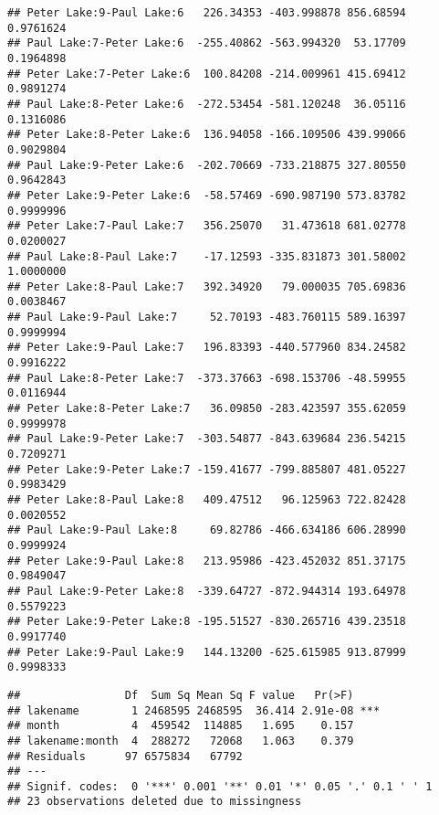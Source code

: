 \documentclass[]{article}
\newenvironment{Shaded}{\begin{snugshade}}{\end{snugshade}}
\newcommand{\CommentTok}[1]{\textcolor[rgb]{0.56,0.35,0.01}{\textit{#1}}}
\newcommand{\DataTypeTok}[1]{\textcolor[rgb]{0.13,0.29,0.53}{#1}}
\newcommand{\FloatTok}[1]{\textcolor[rgb]{0.00,0.00,0.81}{#1}}
\newcommand{\KeywordTok}[1]{\textcolor[rgb]{0.13,0.29,0.53}{\textbf{#1}}}
\newcommand{\NormalTok}[1]{#1}
\newcommand{\OperatorTok}[1]{\textcolor[rgb]{0.81,0.36,0.00}{\textbf{#1}}}
\newcommand{\StringTok}[1]{\textcolor[rgb]{0.31,0.60,0.02}{#1}}
\begin{document}
\begin{verbatim}
## Peter Lake:9-Paul Lake:6   226.34353 -403.998878 856.68594 0.9761624
## Paul Lake:7-Peter Lake:6  -255.40862 -563.994320  53.17709 0.1964898
## Peter Lake:7-Peter Lake:6  100.84208 -214.009961 415.69412 0.9891274
## Paul Lake:8-Peter Lake:6  -272.53454 -581.120248  36.05116 0.1316086
## Peter Lake:8-Peter Lake:6  136.94058 -166.109506 439.99066 0.9029804
## Paul Lake:9-Peter Lake:6  -202.70669 -733.218875 327.80550 0.9642843
## Peter Lake:9-Peter Lake:6  -58.57469 -690.987190 573.83782 0.9999996
## Peter Lake:7-Paul Lake:7   356.25070   31.473618 681.02778 0.0200027
## Paul Lake:8-Paul Lake:7    -17.12593 -335.831873 301.58002 1.0000000
## Peter Lake:8-Paul Lake:7   392.34920   79.000035 705.69836 0.0038467
## Paul Lake:9-Paul Lake:7     52.70193 -483.760115 589.16397 0.9999994
## Peter Lake:9-Paul Lake:7   196.83393 -440.577960 834.24582 0.9916222
## Paul Lake:8-Peter Lake:7  -373.37663 -698.153706 -48.59955 0.0116944
## Peter Lake:8-Peter Lake:7   36.09850 -283.423597 355.62059 0.9999978
## Paul Lake:9-Peter Lake:7  -303.54877 -843.639684 236.54215 0.7209271
## Peter Lake:9-Peter Lake:7 -159.41677 -799.885807 481.05227 0.9983429
## Peter Lake:8-Paul Lake:8   409.47512   96.125963 722.82428 0.0020552
## Paul Lake:9-Paul Lake:8     69.82786 -466.634186 606.28990 0.9999924
## Peter Lake:9-Paul Lake:8   213.95986 -423.452032 851.37175 0.9849047
## Paul Lake:9-Peter Lake:8  -339.64727 -872.944314 193.64978 0.5579223
## Peter Lake:9-Peter Lake:8 -195.51527 -830.265716 439.23518 0.9917740
## Peter Lake:9-Paul Lake:9   144.13200 -625.615985 913.87999 0.9998333
\end{verbatim}

\begin{Shaded}
\end{Shaded}

\begin{verbatim}
##                Df  Sum Sq Mean Sq F value   Pr(>F)    
## lakename        1 2468595 2468595  36.414 2.91e-08 ***
## month           4  459542  114885   1.695    0.157    
## lakename:month  4  288272   72068   1.063    0.379    
## Residuals      97 6575834   67792                     
## ---
## Signif. codes:  0 '***' 0.001 '**' 0.01 '*' 0.05 '.' 0.1 ' ' 1
## 23 observations deleted due to missingness
\end{verbatim}
\end{document}
